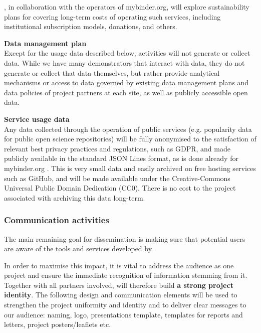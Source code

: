 \TheProject, in collaboration with the operators of mybinder.org,
will explore sustainability plans for covering long-term costs of operating such services,
including institutional subscription models, donations, and others.

\medskip
\noindent \textbf{Data management plan}\label{sec:data-management-plan}\\
Except for the usage data described below,
\TheProject activities will not generate or collect data.
While we have many demonstrators that interact with data, they do not generate or collect that
data themselves, but rather provide analytical mechanisms or access to data governed by
existing data management plans and data policies of project partners at each site,
as well as publicly accessible open data.


\noindent \textbf{Service usage data} \\
Any data collected through the operation of public services
(e.g. popularity data for public open science repositories)
will be fully anonymised to the satisfaction of relevant best privacy practices and regulations, such as GDPR,
and made publicly available in the standard JSON Lines format,
as is done already for mybinder.org \cite{mybinder-archive}.
This is very small data and easily archived on free hosting services such as GitHub,
and will be made available under the Creative-Commons Universal Public Domain Dedication (CC0).
There is no cost to the project associated with archiving this data long-term.

\subsubsection{Communication activities}

The main remaining goal for dissemination is making sure that potential users
are aware of the tools and services developed by \TheProject.

In order to maximise this impact, it is vital to address the audience as one project
and ensure the immediate recognition of information stemming from it.
Together with all partners involved, \TheProject will therefore build \textbf{a strong project identity}.
The following design and communication elements will be used to strengthen the project
uniformity and identity and to deliver clear messages to our audience: \TheProject naming, logo,
presentations template, templates for reports and letters, project posters/leaflets etc.

